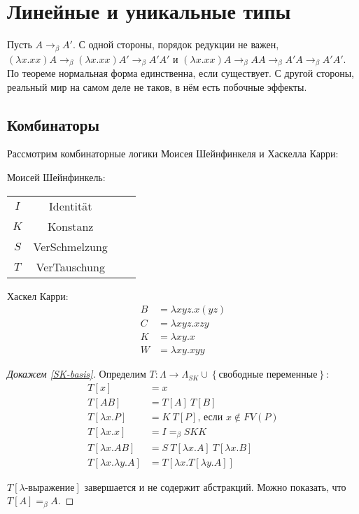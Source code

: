 \section{\texorpdfstring{Линейные и уникальные типы}{Linear and unique types}}

Пусть $A \rightarrow_\beta A'$.
С одной стороны, порядок редукции не важен, %
$(\lambda x . x x) A \rightarrow_\beta (\lambda x . x x) A' \rightarrow_\beta A' A'$
и $(\lambda x . x x) A \rightarrow_\beta A A \rightarrow_\beta A' A \rightarrow_\beta A' A'$.
По теореме  нормальная форма единственна, если существует.
С другой стороны, реальный мир на самом деле не таков, в нём есть побочные эффекты.

\subsection{\texorpdfstring{Комбинаторы}{Combinators}}

Рассмотрим комбинаторные логики Моисея Шейнфинкеля и Хаскелла Карри:

Моисей Шейнфинкель:
\begin{center}
\begin{tabular}{Sc Sl}
    $I$ & Identität \\
    $K$ & Konstanz \\
    $S$ & VerSchmelzung \\
    $T$ & VerTauschung
\end{tabular}
\end{center}

Хаскел Карри:
\begin{align*}
    B &= \lambda x y z . x (y z) \\
    C &= \lambda x y z . x z y \\
    K &= \lambda x y . x \\
    W &= \lambda x y . x y y
\end{align*}


\begin{proof}[Докажем \ref{SK-basis}]
    Определим $T : \Lambda \rightarrow \Lambda_{SK} \cup \left\{ \text{свободные переменные} \right\}$:
    \begin{align*}
        T[x] &= x \\
        T[A B] &= T[A]\ T[B]  \\
        T[\lambda x . P] &= K\ T[P] \text{, если $x \notin FV(P)$} \\
        T[\lambda x . x] &= I =_\beta SKK \\
        T[\lambda x . A B] &= S\ T[\lambda x . A]\ T[\lambda x . B] \\
        T[\lambda x . \lambda y . A] &= T[\lambda x . T[\lambda y . A]]
    \end{align*}

    $T[\lambda\text{-выражение}]$ завершается и не содержит абстракций.
    Можно показать, что $T[A] =_\beta A$.
\end{proof}

